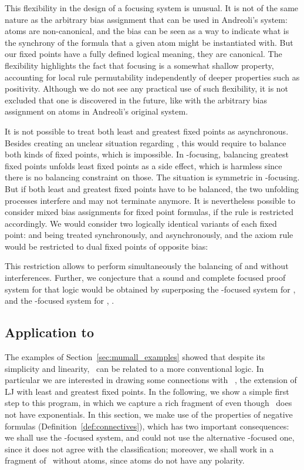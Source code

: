 This flexibility in the design of a focusing system is unusual.
It is not of the same nature as the arbitrary bias assignment that
can be used in Andreoli's system: atoms are non-canonical, and the bias
can be seen as a way to indicate what is the synchrony of the formula
that a given atom might be instantiated with. But our fixed points
have a fully defined logical meaning, they are canonical.
The flexibility highlights the fact that focusing is a somewhat shallow
property, accounting for local rule permutability
independently of deeper properties such as positivity.
Although we do not see any practical use of such flexibility,
it is not excluded that one is discovered in the future,
like with the arbitrary bias assignment on atoms in Andreoli's original 
system.

It is not possible to treat both least and greatest fixed points
as asynchronous. Besides creating an unclear situation regarding ,
this would require to balance both kinds of fixed points, which is
impossible. In -focusing, balancing greatest fixed points unfolds
least fixed points as a side effect, which is harmless since there is
no balancing constraint on those. The situation is symmetric in
-focusing. But if both least and greatest fixed points
have to be balanced, the two unfolding processes interfere
and may not terminate anymore.
It is nevertheless possible to consider mixed bias assignments
for fixed point formulas, if the  rule is restricted accordingly.
We would consider two logically identical variants
of each fixed point:  and  being treated synchronously,
 and  asynchronously, and the axiom rule would be
restricted to dual fixed points of opposite bias:

This restriction allows to perform simultaneously the balancing of
 and  without interferences. Further, we conjecture
that a sound and complete focused proof system for that logic would be
obtained by superposing
the -focused system for ,  and the -focused
system for , .

\subsection{Application to \muLJL} \label{sec:foc_mulj}

The examples of Section~\ref{sec:mumall_examples} showed that despite
its simplicity and linearity, \mumall\ can be related to a more
conventional logic.
In particular we are interested in drawing some connections with
\muLJ~\cite{baelde08phd},
the extension of LJ with least and greatest fixed points.
In the following, we show a simple first step to this program,
in which we capture a rich fragment of \muLJ{}
even though \mumall\ does not have exponentials.
In this section, we make use of the properties of negative formulas
(Definition~\ref{def:connectives}), which has two important consequences:
we shall use the -focused system, and could not use the
alternative -focused one, since it does not agree with the 
classification;
moreover, we shall work in a fragment of \mumall\ without atoms,
since atoms do not have any polarity.

